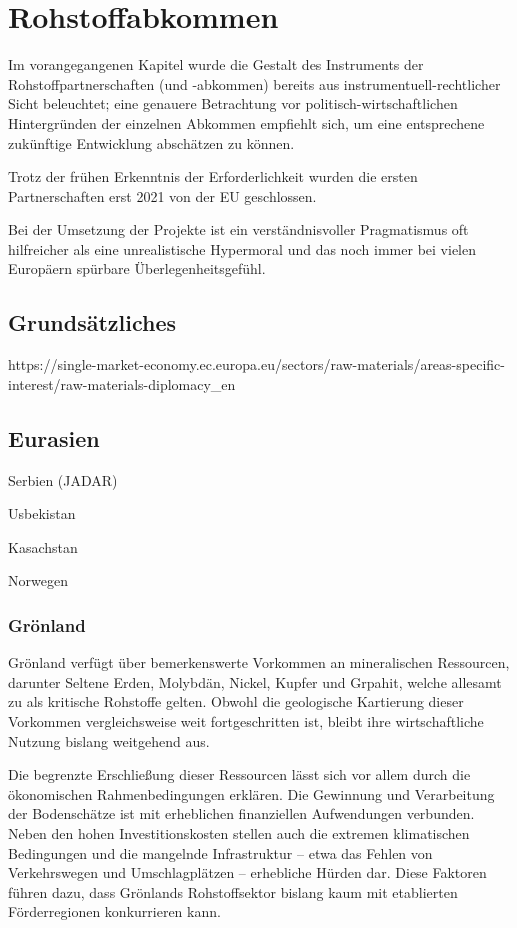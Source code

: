 \documentclass[12pt,a4paper,oneside]{book} %
\begin{document}
\section{Rohstoffabkommen}
Im vorangegangenen Kapitel wurde die Gestalt des Instruments der Rohstoffpartnerschaften (und -abkommen) bereits aus instrumentuell-rechtlicher Sicht beleuchtet; eine genauere Betrachtung vor politisch-wirtschaftlichen Hintergründen der einzelnen Abkommen empfiehlt sich, um eine entsprechene zukünftige Entwicklung abschätzen zu können.

Trotz der frühen Erkenntnis der Erforderlichkeit wurden die ersten Partnerschaften erst 2021 von der EU geschlossen.

\glqq Bei der Umsetzung der Projekte ist ein verständnisvoller Pragmatismus oft hilfreicher als eine unrealistische Hypermoral und das noch immer bei vielen Europäern spürbare Überlegenheitsgefühl.\grqq \autocite{https://www.africa-business-guide.de/de/praxis/erfahrungen/schluesselrolle-afrikas-bedeutung-bei-den-kritischen-rohstoffen--1920084}

\subsection{Grundsätzliches}

https://single-market-economy.ec.europa.eu/sectors/raw-materials/areas-specific-interest/raw-materials-diplomacy_en

\subsection{Eurasien}

Serbien (JADAR)

Usbekistan

Kasachstan

Norwegen

\subsubsection{Grönland}

Grönland verfügt über bemerkenswerte Vorkommen an mineralischen Ressourcen, darunter Seltene Erden, Molybdän, Nickel, Kupfer und Grpahit, welche allesamt zu als kritische Rohstoffe gelten. Obwohl die geologische Kartierung dieser Vorkommen vergleichsweise weit fortgeschritten ist, bleibt ihre wirtschaftliche Nutzung bislang weitgehend aus.

Die begrenzte Erschließung dieser Ressourcen lässt sich vor allem durch die ökonomischen Rahmenbedingungen erklären. Die Gewinnung und Verarbeitung der Bodenschätze ist mit erheblichen finanziellen Aufwendungen verbunden. Neben den hohen Investitionskosten stellen auch die extremen klimatischen Bedingungen und die mangelnde Infrastruktur – etwa das Fehlen von Verkehrswegen und Umschlagplätzen – erhebliche Hürden dar. Diese Faktoren führen dazu, dass Grönlands Rohstoffsektor bislang kaum mit etablierten Förderregionen konkurrieren kann.
\end{document}
